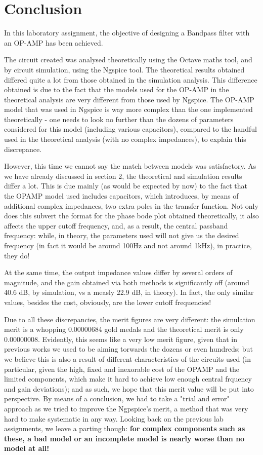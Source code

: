\section{Conclusion}
\label{sec:conclusion}

In this laboratory assignment, the objective of designing a Bandpass filter with an OP-AMP has been achieved.\par
The circuit created was analysed theoretically using the Octave maths tool, and by circuit simulation, using the
Ngspice tool. The theoretical results obtained differed quite a lot from those obtained in the simulation analysis. This difference obtained is due to the fact that the models used for the OP-AMP in the theoretical analysis are very different from those used by Ngspice. The OP-AMP model that was used in Ngspice is way more complex than the one implemented theoretically - one needs to look no further than the dozens of parameters considered for this model (including various capacitors), compared to the handful used in the theoretical analysis (with no complex impedances), to explain this discrepance. 

However, this time we cannot say the match between models was satisfactory. As we have already discussed in section 2, the theoretical and simulation results differ a lot. This is due mainly (as would be expected by now) to the fact that the OPAMP model used includes capacitors, which introduces, by means of additional complex impedances, two extra poles in the transfer function. Not only does this subvert the format for the phase bode plot obtained theoretically, it also affects the upper cutoff frequency, and, as a result, the central passband frequency: while, in theory, the parameters used will not give us the desired frequency (in fact it would be around 100Hz and not around 1kHz), in practice, they do! \par
At the same time, the output impedance values differ by several orders of magnitude, and the gain obtained via both methods is significantly off (around 40.6 dB, by simulation, vs a measly 22.9 dB, in theory). In fact, the only similar values, besides the cost, obviously, are the lower cutoff frequencies!\par
Due to all these discrepancies, the merit figures are very different: the simulation merit is a whopping 0.00000684 gold medals and the theoretical merit is only 0.00000008. Evidently, this seems like a very low merit figure, given that in previous works we used to be aiming torwards the dozens or even hundreds; but we believe this is also a result of different characteristics of the circuits used (in particular, given the high, fixed and inexorable cost of the OPAMP and the limited components, which make it hard to achieve low enough central frquency and gain deviations); and as such, we hope that this merit value will be put into perspective. 
By means of a conclusion, we had to take a "trial and error" approach as we tried to improve the Ngpspice's merit, a method that was very hard to make systematic in any way. Looking back on the previous lab assignments, we leave a parting though: \textbf{for complex components such as these, a bad model or an incomplete model is nearly worse than no model at all!}\par


